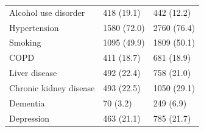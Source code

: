 \begin{table}
\begin{tabular}[t]{lll}
Alcohol use disorder & 418 (19.1) & 442 (12.2)\\
Hypertension & 1580 (72.0) & 2760 (76.4)\\
Smoking & 1095 (49.9) & 1809 (50.1)\\
\addlinespace
COPD & 411 (18.7) & 681 (18.9)\\
Liver disease & 492 (22.4) & 758 (21.0)\\
Chronic kidney disease & 493 (22.5) & 1050 (29.1)\\
Dementia & 70 (3.2) & 249 (6.9)\\
Depression & 463 (21.1) & 785 (21.7)\\
\bottomrule
\end{tabular}
\end{table}

